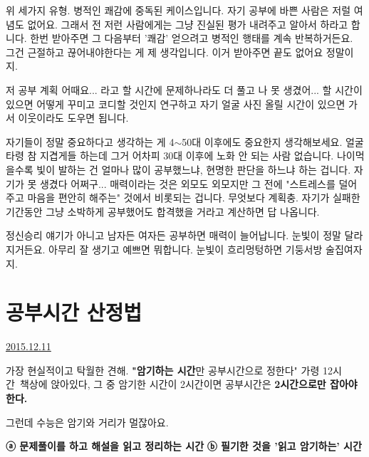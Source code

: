 위 세가지 유형. 병적인 쾌감에 중독된 케이스입니다.
자기 공부에 바쁜 사람은 저럴 여념도 없어요.
그래서 전 저런 사람에게는 그냥 진실된 평가 내려주고 알아서 하라고 합니다.
한번 받아주면 그 다음부터 '쾌감' 얻으려고 병적인 행태를 계속 반복하거든요.
그건 근절하고 끊어내야한다는 게 제 생각입니다.
이거 받아주면 끝도 없어요 정말이지.
\vspace{5mm}

저 공부 계획 어때요... 라고 할 시간에 문제하나라도 더 풀고
나 못 생겼어... 할 시간이 있으면 어떻게 꾸미고 코디할 것인지 연구하고
자기 얼굴 사진 올릴 시간이 있으면 가서 이웃이라도 도우면 됩니다.
\vspace{5mm}

자기들이 정말 중요하다고 생각하는 게 4$\sim$50대 이후에도 중요한지 생각해보세요.
얼굴 타령 참 지겹게들 하는데 그거 어차피 30대 이후에 노화 안 되는 사람 없습니다.
나이먹을수록 빛이 발하는 건 얼마나 많이 공부했느냐, 현명한 판단을 하느냐 하는 겁니다.
자기가 못 생겼다 어쩌구... 매력이라는 것은 외모도 외모지만
그 전에 "스트레스를 덜어주고 마음을 편안히 해주는" 것에서 비롯되는 겁니다.
무엇보다 계획충. 자기가 실패한 기간동안 그냥 소박하게 공부했어도 합격했을 거라고 계산하면 답 나옵니다.
\vspace{5mm}

정신승리 얘기가 아니고 남자든 여자든 공부하면 매력이 늘어납니다.
눈빛이 정말 달라지거든요.
아무리 잘 생기고 예쁘면 뭐합니다. 눈빛이 흐리멍텅하면 기둥서방 술집여자지.
\vspace{5mm}








\section{공부시간 산정법}
\href{https://www.kockoc.com/Apoc/539674}{2015.12.11}

\vspace{5mm}

가장 현실적이고 탁월한 견해.
\textbf{"암기하는 시간}만 공부시간으로 정한다"
가령 12시간 책상에 앉아있다, 그 중 암기한 시간이 2시간이면 공부시간은 \textbf{2시간으로만 잡아야 한다.}
\vspace{5mm}

그런데 수능은 암기와 거리가 멀잖아요.
\vspace{5mm}

\textbf{ⓐ 문제풀이를 하고 해설을 읽고 정리하는 시간}
\textbf{ⓑ 필기한 것을 '읽고 암기하는' 시간}
\vspace{5mm}

